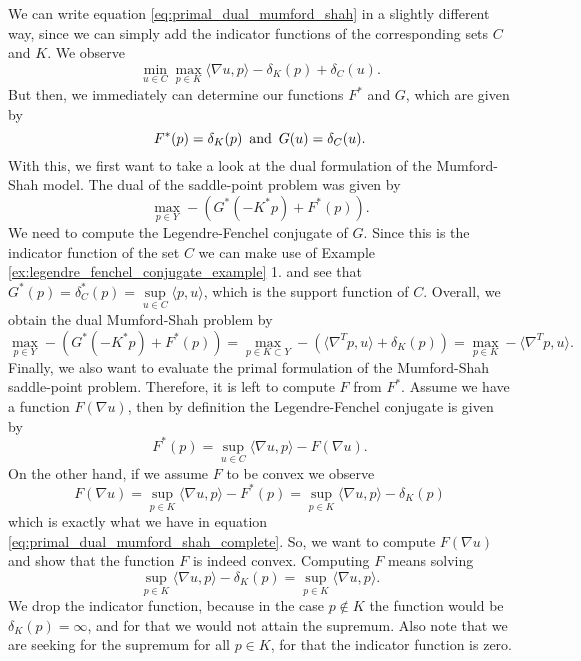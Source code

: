 		We can write equation \ref{eq:primal_dual_mumford_shah} in a slightly different way, since we can simply add the indicator functions of the corresponding sets $C$ and $K$. We observe
			\begin{equation}
				\min_{u \in C} \max_{p \in K} \langle \nabla u, p \rangle - \delta_{K}(p) + \delta_{C}(u).
				\label{eq:primal_dual_mumford_shah_complete}
			\end{equation}
		But then, we immediately can determine our functions $F^{\ast}$ and $G$, which are given by
			$$
				F^{\ast}(p) = \delta_{K}(p) \,\,\, \textnormal{and} \,\,\, G(u) = \delta_{C}(u).
			$$
		With this, we first want to take a look at the dual formulation of the Mumford-Shah model. The dual of the saddle-point problem was given by
			$$
	            \max_{p \in Y} -(G^{\ast}(-K^{\ast}p) + F^{\ast}(p)).
	        $$
	    We need to compute the Legendre-Fenchel conjugate of $G$. Since this is the indicator function of the set $C$ we can make use of Example \ref{ex:legendre_fenchel_conjugate_example} 1. and see that $G^{\ast}(p) = \delta^{\ast}_{C}(p) = \sup\limits_{u \in C} \langle p, u \rangle$, which is the support function of $C$. Overall, we obtain the dual Mumford-Shah problem by
	    	\begin{equation}
	    		\max_{p \in Y} -(G^{\ast}(-K^{\ast}p) + F^{\ast}(p)) = \max_{p \in K \subset Y} -(\langle \nabla^{T}p, u \rangle + \delta_{K}(p)) = \max_{p \in K} -\langle \nabla^{T}p, u \rangle.
	    	\label{eq:dual_mumford_shah}
	    	\end{equation}
	    Finally, we also want to evaluate the primal formulation of the Mumford-Shah saddle-point problem. Therefore, it is left to compute $F$ from $F^{\ast}$. Assume we have a function $F(\nabla u)$, then by definition the Legendre-Fenchel conjugate is given by
	    	$$
	    		F^{\ast}(p) = \sup_{u \in C} \langle \nabla u, p \rangle - F(\nabla u).
	    	$$
	    On the other hand, if we assume $F$ to be convex we observe
	    	$$
	    		F(\nabla u) = \sup_{p \in K} \langle \nabla u, p \rangle - F^{\ast}(p) = \sup_{p \in K} \langle \nabla u, p \rangle - \delta_{K}(p)
	    	$$
	    which is exactly what we have in equation \ref{eq:primal_dual_mumford_shah_complete}. So, we want to compute $F(\nabla u)$ and show that the function $F$ is indeed convex. Computing $F$ means solving
	    	$$
	    		\sup_{p \in K} \langle \nabla u, p \rangle - \delta_{K}(p) = \sup_{p \in K} \langle \nabla u, p \rangle.
	    	$$
	    We drop the indicator function, because in the case $p \notin K$ the function would be $\delta_{K}(p) = \infty$, and for that we would not attain the supremum. Also note that we are seeking for the supremum for all $p \in K$, for that the indicator function is zero.
